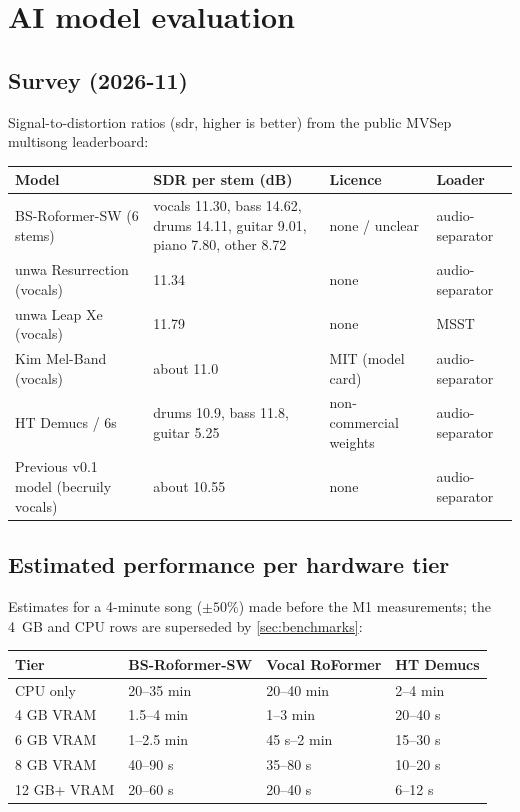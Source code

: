 \documentclass{covermaker}
\begin{document}
\chapter{AI model evaluation}
\section{Survey (2026-11)}
Signal-to-distortion ratios (\gls{sdr}, higher is better) from the public MVSep
multisong leaderboard:

\begin{tabularx}{\linewidth}{@{}lYll@{}}
\toprule
\textbf{Model} & \textbf{SDR per stem (dB)} & \textbf{Licence} & \textbf{Loader} \\
\midrule
BS-Roformer-SW (6 stems) & vocals 11.30, bass 14.62, drums 14.11, guitar 9.01, piano 7.80, other 8.72 & none / unclear & audio-separator \\
unwa Resurrection (vocals) & 11.34 & none & audio-separator \\
unwa Leap Xe (vocals) & 11.79 & none & MSST \\
Kim Mel-Band (vocals) & about 11.0 & MIT (model card) & audio-separator \\
HT Demucs / 6s & drums 10.9, bass 11.8, guitar 5.25 & non-commercial weights & audio-separator \\
Previous v0.1 model (becruily vocals) & about 10.55 & none & audio-separator \\
\bottomrule
\end{tabularx}

\section{Estimated performance per hardware tier}
Estimates for a 4-minute song (\(\pm 50\%\)) made before the M1 measurements;
the 4~GB and CPU rows are superseded by \autoref{sec:benchmarks}:

\begin{tabularx}{\linewidth}{@{}lYYY@{}}
\toprule
\textbf{Tier} & \textbf{BS-Roformer-SW} & \textbf{Vocal RoFormer} & \textbf{HT Demucs} \\
\midrule
CPU only & 20--35 min & 20--40 min & 2--4 min \\
4 GB VRAM & 1.5--4 min & 1--3 min & 20--40 s \\
6 GB VRAM & 1--2.5 min & 45 s--2 min & 15--30 s \\
8 GB VRAM & 40--90 s & 35--80 s & 10--20 s \\
12 GB+ VRAM & 20--60 s & 20--40 s & 6--12 s \\
\bottomrule
\end{tabularx}
\end{document}
